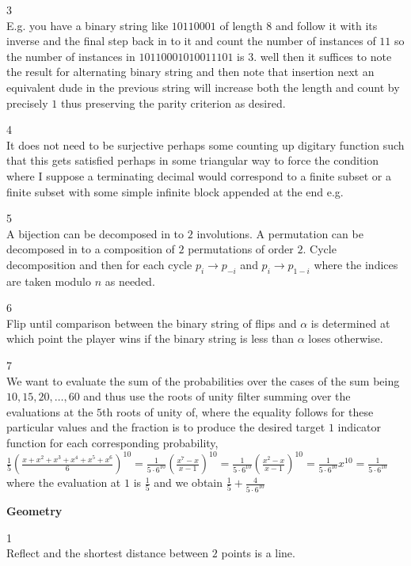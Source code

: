 3 \\
E.g. you have a binary string like $10110001$ of length $8$ and follow it with its inverse and the final step back in to it and count the number of instances of $11$ so the number of instances in $10110001010011101$ is $3$. well then it suffices to note the result for alternating binary string and then note that insertion next an equivalent dude in the previous string will increase both the length and count by precisely $1$ thus preserving the parity criterion as desired.

4 \\
It does not need to be surjective perhaps some counting up digitary function such that this gets satisfied perhaps in some triangular way to force the condition where I suppose a terminating decimal would correspond to a finite subset or a finite subset with some simple infinite block appended at the end e.g.

5 \\
A bijection can be decomposed in to $2$ involutions. A permutation can be decomposed in to a composition of $2$ permutations of order $2$. Cycle decomposition and then for each cycle $p_i \to p_{-i}$ and $p_i \to p_{1-i}$ where the indices are taken modulo $n$ as needed.

6 \\
Flip until comparison between the binary string of flips and $\alpha$ is determined at which point the player wins if the binary string is less than $\alpha$ loses otherwise.

7 \\
We want to evaluate the sum of the probabilities over the cases of the sum being $10,15,20,\dots,60$ and thus use the roots of unity filter summing over the evaluations at the $5$th roots of unity of, where the equality follows for these particular values and the fraction is to produce the desired target $1$ indicator function for each corresponding probability, $\frac{1}{5}\left(\frac{x+x^2+x^3+x^4+x^5+x^6}{6}\right)^{10}=\frac{1}{5\cdot 6^{10}}\left(\frac{x^7-x}{x-1}\right)^{10}=\frac{1}{5\cdot 6^{10}}\left(\frac{x^2-x}{x-1}\right)^{10}=\frac{1}{5\cdot 6^{10}}x^{10}=\frac{1}{5\cdot 6^{10}}$ where the evaluation at $1$ is $\frac{1}{5}$ and we obtain $\boxed{\frac{1}{5}+\frac{4}{5\cdot 6^{10}}}$

\newpage

\textbf{Geometry}

1 \\
Reflect and the shortest distance between $2$ points is a line.

